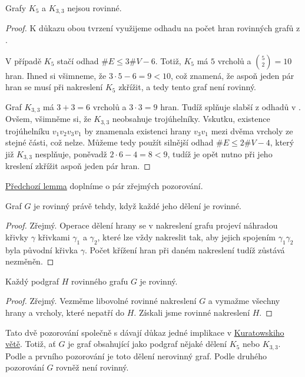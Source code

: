 \begin{lemma}
 \label{lem:k33-k5-nerovinne}
 Grafy $K_5$ a $K_{3,3}$ nejsou rovinné.
\end{lemma}
\begin{proof}
 K důkazu obou tvrzení využijeme odhadu na počet hran rovinných grafů z
 .

 V případě $K_5$ stačí odhad $\# E \leq 3\# V - 6$. Totiž, $K_5$ má $5$ vrcholů
 a $\binom{5}{2} = 10$ hran. Ihned si všimneme, že $3 \cdot 5 - 6 = 9 < 10$, což
 znamená, že aspoň jeden pár hran se musí při nakreslení $K_5$ zkřížit, a tedy
 tento graf není rovinný.

 Graf $K_{3,3}$ má $3 + 3 = 6$ vrcholů a $3 \cdot 3 = 9$ hran. Tudíž splňuje
 slabší z odhadů v . Ovšem, všimněme
 si, že $K_{3,3}$ neobsahuje trojúhelníky. Vskutku, existence trojúhelníku
 $v_1v_2v_3v_1$ by znamenala existenci hrany $v_3v_1$ mezi dvěma vrcholy ze
 stejné části, což nelze. Můžeme tedy použít silnější odhad $\# E \leq 2\# V -
 4$, který již $K_{3,3}$ nesplňuje, poněvadž $2 \cdot 6 - 4 = 8 < 9$, tudíž je
 opět nutno při jeho kreslení zkřížit aspoň jeden pár hran.
\end{proof}

\hyperref[lem:k33-k5-nerovinne]{Předchozí lemma} doplníme o pár zřejmých
pozorování.

\begin{observation}
 Graf $G$ je rovinný právě tehdy, když každé jeho dělení je rovinné.
\end{observation}
\begin{proof}
 Zřejmý. Operace dělení hrany se v nakreslení grafu projeví náhradou křivky
 $\gamma$ křivkami $\gamma_1$ a $\gamma_2$, které lze vždy nakreslit tak, aby
 jejich spojením $\gamma_1\gamma_2$ byla původní křivka $\gamma$. Počet křížení
 hran při daném nakreslení tudíž zůstává nezměněn.
\end{proof}

\begin{observation}
 Každý podgraf $H$ rovinného grafu $G$ je rovinný.
\end{observation}
\begin{proof}
 Zřejmý. Vezměme libovolné rovinné nakreslení $G$ a vymažme všechny hrany a
 vrcholy, které nepatří do $H$. Získali jsme rovinné nakreslení $H$.
\end{proof}

Tato dvě pozorování společně s  dávají
důkaz jedné implikace v \hyperref[thm:kuratowskiho]{Kuratowskiho větě}. Totiž,
ať $G$ je graf obsahující jako podgraf nějaké dělení $K_5$ nebo $K_{3,3}$. Podle
 a prvního pozorování je toto dělení
nerovinný graf. Podle druhého pozorování $G$ rovněž není rovinný.

